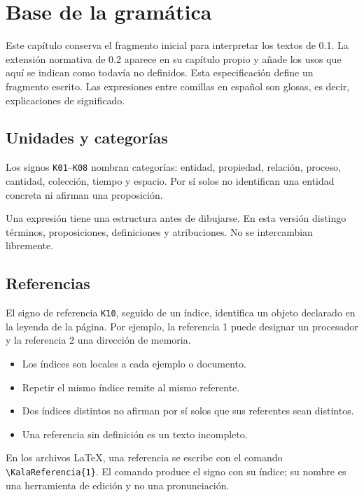 \section{Base de la gramática}

Este capítulo conserva el fragmento inicial para interpretar los textos de 0.1. La extensión normativa de 0.2 aparece en su capítulo propio y añade los usos que aquí se indican como todavía no definidos. Esta especificación define un fragmento escrito. Las expresiones entre comillas en español son glosas, es decir, explicaciones de significado.

\subsection{Unidades y categorías}

Los signos \texttt{K01}–\texttt{K08} nombran categorías: entidad, propiedad, relación, proceso, cantidad, colección, tiempo y espacio. Por sí solos no identifican una entidad concreta ni afirman una proposición.

Una expresión tiene una estructura antes de dibujarse. En esta versión distingo términos, proposiciones, definiciones y atribuciones. No se intercambian libremente.

\subsection{Referencias}

El signo de referencia \texttt{K10}, seguido de un índice, identifica un objeto declarado en la leyenda de la página. Por ejemplo, la referencia 1 puede designar un procesador y la referencia 2 una dirección de memoria.

\begin{itemize}
\item Los índices son locales a cada ejemplo o documento.
\item Repetir el mismo índice remite al mismo referente.
\item Dos índices distintos no afirman por sí solos que sus referentes sean distintos.
\item Una referencia sin definición es un texto incompleto.
\end{itemize}

En los archivos LaTeX, una referencia se escribe con el comando \texttt{\textbackslash{}KalaReferencia\{1\}}. El comando produce el signo con su índice; su nombre es una herramienta de edición y no una pronunciación.

